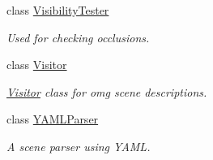 \begin{DoxyCompactItemize}
class \mbox{\hyperlink{classomg_1_1_visibility_tester}{Visibility\+Tester}}
\begin{DoxyCompactList}\small\item\em Used for checking occlusions. \end{DoxyCompactList}\item 
class \mbox{\hyperlink{classomg_1_1_visitor}{Visitor}}
\begin{DoxyCompactList}\small\item\em \mbox{\hyperlink{classomg_1_1_visitor}{Visitor}} class for omg scene descriptions. \end{DoxyCompactList}\item 
class \mbox{\hyperlink{classomg_1_1_y_a_m_l_parser}{Y\+A\+M\+L\+Parser}}
\begin{DoxyCompactList}\small\item\em A scene parser using Y\+A\+ML. \end{DoxyCompactList}\end{DoxyCompactItemize}
